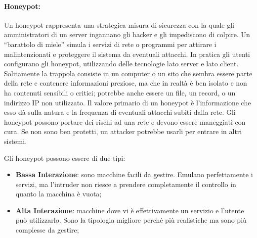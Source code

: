 \paragraph{Honeypot: } %
Un honeypot rappresenta una strategica misura di sicurezza con la quale gli
amministratori
di un server ingannano gli hacker e gli impediscono di colpire.
Un “barattolo di miele” simula i
servizi di rete o programmi per attirare i malintenzionati e proteggere il
sistema da eventuali
attacchi. In pratica gli utenti configurano gli honeypot, utilizzando delle
tecnologie lato server e lato
client. Solitamente la trappola consiste in un computer o un sito che sembra
essere parte della rete
e contenere informazioni preziose, ma che in realtà è ben isolato e non ha
contenuti sensibili o
critici; potrebbe anche essere un file, un record, o un indirizzo IP non utilizzato.
Il valore primario di un honeypot è l'informazione che esso dà sulla natura e la
frequenza di
eventuali attacchi subiti dalla rete.
Gli honeypot possono portare dei rischi ad una rete e devono essere maneggiati
con cura. Se non
sono ben protetti, un attacker potrebbe usarli per entrare in altri sistemi.

Gli honeypot possono essere di due tipi:
\begin{itemize}
    \item \textbf{Bassa Interazione}: sono macchine facili da gestire. Emulano perfettamente
          i servizi, ma l'intruder non riesce a prendere completamente il controllo in
          quanto la macchina è vuota;
    \item \textbf{Alta Interazione}: macchine dove vi è effettivamente un servizio e
          l'utente può utilizzarlo.
          Sono la tipologia migliore perché più realistiche ma sono più complesse
          da gestire;
\end{itemize}